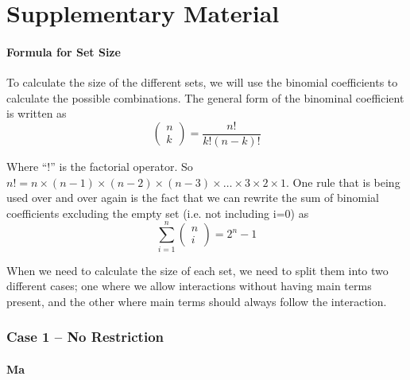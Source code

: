 \part*{Supplementary Material} 

\setcounter{table}{0}
\setcounter{figure}{0}
\renewcommand{\thetable}{S\arabic{table}}
\renewcommand{\thefigure}{S\arabic{figure}}

\subsection{Formula for Set Size}
To calculate the size of the different sets, we will use the binomial coefficients to calculate the possible combinations. The general form of the binominal coefficient is written as
\[\left( \begin{array}{c}
n \\ 
k \end{array}
\right)=\frac{n!}{k!\left(n-k\right)!}\] 

Where ``!'' is the factorial operator. So $n!=n\times \left(n-1\right)\times \left(n-2\right)\times \left(n-3\right)\times \dots \times 3\times 2\times 1$. One rule that is being used over and over again is the fact that we can rewrite the sum of binomial coefficients excluding the empty set (i.e. not including i=0) as 
\[\sum^n_{i=1}{\left( \begin{array}{c}
n \\ 
i \end{array}
\right)}=2^n-1\] 

When we need to calculate the size of each set, we need to split them into two different cases; one where we allow interactions without having main terms present, and the other where main terms should always follow the interaction. \\

\section{Case 1 – No Restriction}
\subsection{Ma}

